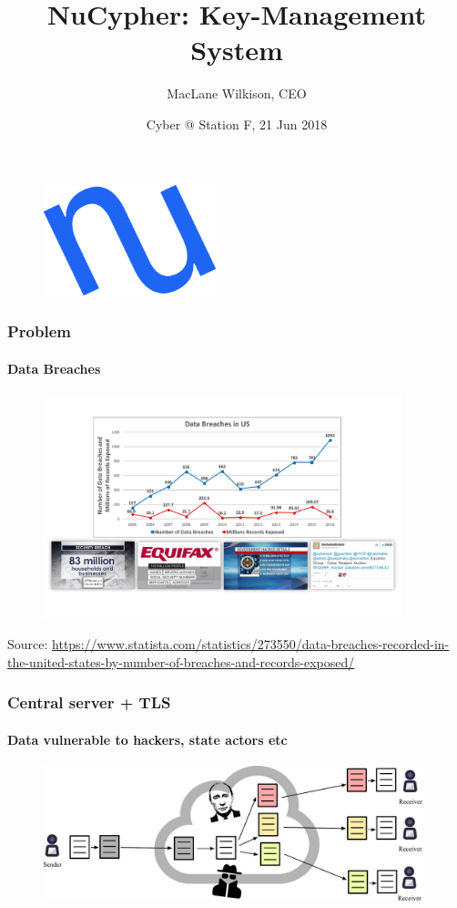 \documentclass[xetex,mathsans,sans]{beamer}
\title[NuCypher]{NuCypher: Key-Management System}
\author[MacLane]{MacLane Wilkison, CEO}
\date[21 Jun 2018]{Cyber @ Station F, 21 Jun 2018}
\begin{document}
    \begin{frame}
        \titlepage
        \begin{figure}
            \centering
            \includegraphics[width=5cm]{pdf/nucypher_logo.pdf}
        \end{figure}
    \end{frame}

    \begin{frame}
      \frametitle{Problem}
      \framesubtitle{Data Breaches}
        \begin{figure}
            \centering
            \includegraphics[height=6.5cm]{pdf/data-breaches.pdf}
        \end{figure}

        {\tiny Source: \url{https://www.statista.com/statistics/273550/data-breaches-recorded-in-the-united-states-by-number-of-breaches-and-records-exposed/} \par}
    \end{frame}

    \begin{frame}
        \frametitle{Central server + TLS}
        \framesubtitle{Data vulnerable to hackers, state actors etc}
        \begin{figure}
            \centering
            \includegraphics[width=11cm]{pdf/file-sharing-tls.pdf}
        \end{figure}
    \end{frame}
\end{document}
